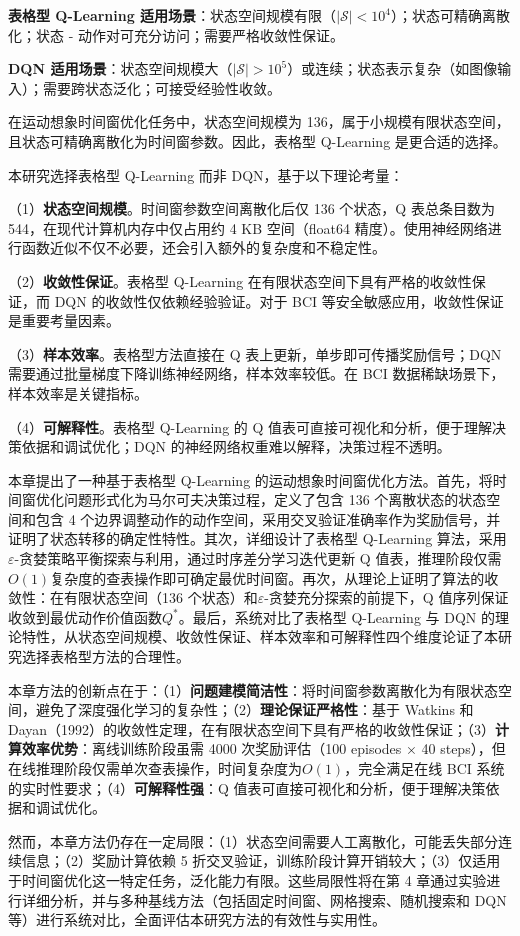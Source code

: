\textbf{表格型 Q-Learning 适用场景}：状态空间规模有限（$|\mathcal{S}| < 10^4$）；状态可精确离散化；状态 - 动作对可充分访问；需要严格收敛性保证。

\textbf{DQN 适用场景}：状态空间规模大（$|\mathcal{S}| > 10^5$）或连续；状态表示复杂（如图像输入）；需要跨状态泛化；可接受经验性收敛。

在运动想象时间窗优化任务中，状态空间规模为 136，属于小规模有限状态空间，且状态可精确离散化为时间窗参数。因此，表格型 Q-Learning 是更合适的选择。

\label{subsec:rationale}

本研究选择表格型 Q-Learning 而非 DQN，基于以下理论考量：

（1）\textbf{状态空间规模}。时间窗参数空间离散化后仅 136 个状态，Q 表总条目数为 544，在现代计算机内存中仅占用约 4 KB 空间（float64 精度）。使用神经网络进行函数近似不仅不必要，还会引入额外的复杂度和不稳定性。

（2）\textbf{收敛性保证}。表格型 Q-Learning 在有限状态空间下具有严格的收敛性保证，而 DQN 的收敛性仅依赖经验验证。对于 BCI 等安全敏感应用，收敛性保证是重要考量因素。

（3）\textbf{样本效率}。表格型方法直接在 Q 表上更新，单步即可传播奖励信号；DQN 需要通过批量梯度下降训练神经网络，样本效率较低。在 BCI 数据稀缺场景下，样本效率是关键指标。

（4）\textbf{可解释性}。表格型 Q-Learning 的 Q 值表可直接可视化和分析，便于理解决策依据和调试优化；DQN 的神经网络权重难以解释，决策过程不透明。


本章提出了一种基于表格型 Q-Learning 的运动想象时间窗优化方法。首先，将时间窗优化问题形式化为马尔可夫决策过程，定义了包含 136 个离散状态的状态空间和包含 4 个边界调整动作的动作空间，采用交叉验证准确率作为奖励信号，并证明了状态转移的确定性特性。其次，详细设计了表格型 Q-Learning 算法，采用$\varepsilon$-贪婪策略平衡探索与利用，通过时序差分学习迭代更新 Q 值表，推理阶段仅需$O(1)$复杂度的查表操作即可确定最优时间窗。再次，从理论上证明了算法的收敛性：在有限状态空间（136 个状态）和$\varepsilon$-贪婪充分探索的前提下，Q 值序列保证收敛到最优动作价值函数$Q^*$。最后，系统对比了表格型 Q-Learning 与 DQN 的理论特性，从状态空间规模、收敛性保证、样本效率和可解释性四个维度论证了本研究选择表格型方法的合理性。

本章方法的创新点在于：（1）\textbf{问题建模简洁性}：将时间窗参数离散化为有限状态空间，避免了深度强化学习的复杂性；（2）\textbf{理论保证严格性}：基于 Watkins 和 Dayan（1992）的收敛性定理，在有限状态空间下具有严格的收敛性保证；（3）\textbf{计算效率优势}：离线训练阶段虽需 4000 次奖励评估（100 episodes × 40 steps），但在线推理阶段仅需单次查表操作，时间复杂度为$O(1)$，完全满足在线 BCI 系统的实时性要求；（4）\textbf{可解释性强}：Q 值表可直接可视化和分析，便于理解决策依据和调试优化。

然而，本章方法仍存在一定局限：（1）状态空间需要人工离散化，可能丢失部分连续信息；（2）奖励计算依赖 5 折交叉验证，训练阶段计算开销较大；（3）仅适用于时间窗优化这一特定任务，泛化能力有限。这些局限性将在第 4 章通过实验进行详细分析，并与多种基线方法（包括固定时间窗、网格搜索、随机搜索和 DQN 等）进行系统对比，全面评估本研究方法的有效性与实用性。
